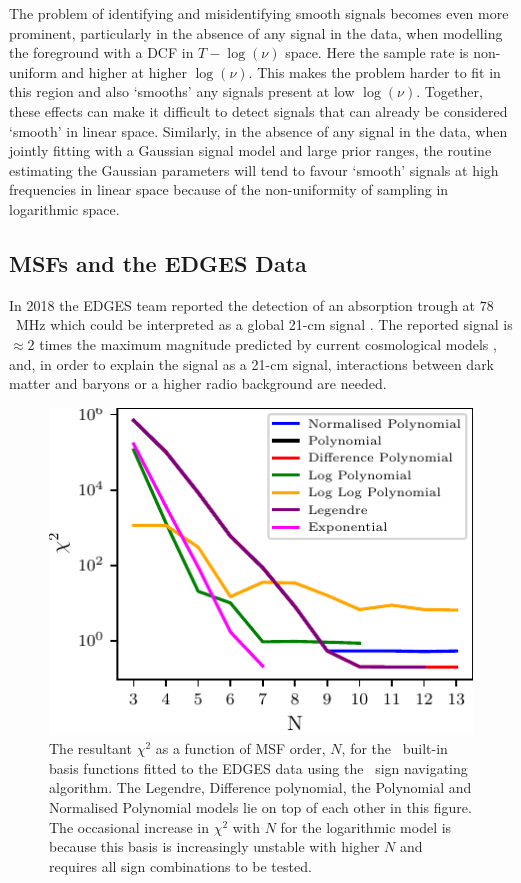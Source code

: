 The problem of identifying and misidentifying smooth signals becomes even more prominent, particularly in the absence of any signal in the data, when modelling the foreground with a DCF in $T - \log(\nu)$ space. Here the sample rate is non-uniform and higher at higher $\log(\nu)$. This makes the problem harder to fit in this region and also `smooths' any signals present at low $\log(\nu)$. Together, these effects can make it difficult to detect signals that can already be considered `smooth' in linear space. Similarly, in the absence of any signal in the data, when jointly fitting with a Gaussian signal model and large prior ranges, the routine estimating the Gaussian parameters will tend to favour `smooth' signals at high frequencies in linear space because of the non-uniformity of sampling in logarithmic space.

\subsection{MSFs and the EDGES Data}
\label{sec:EDGES_fits}

In 2018 the EDGES team reported the detection of an absorption trough at $78$~MHz which could be interpreted as a global 21-cm signal \citep[]{Bowman_edges_2018}. The reported signal is $\approx 2$ times the maximum magnitude predicted by current cosmological models \citep[]{Cohen_global_2017}, and, in order to explain the signal as a 21-cm signal, interactions between dark matter and baryons \citep{Barkana_DM_2018, Barkana_DM_2018, KovetzDM2018, MunozDM2018, SlatyerDM2018} or a higher radio background \citep{Bowman_edges_2018, EwallRB2018, FengRB2018, JanaRB2018, Fialkov2019, MirochaRB2019} are needed.

\begin{figure}
    \centering
    \includegraphics{maxsmooth/figs/Figure10.pdf}
    \caption{The resultant $\chi^2$ as a function of MSF order, $N$, for the \maxsmooth~built-in basis functions fitted to the EDGES data using the \maxsmooth~sign navigating algorithm. The Legendre, Difference polynomial, the Polynomial and Normalised Polynomial models lie on top of each other in this figure. The occasional increase in $\chi^2$ with $N$ for the logarithmic model is because this basis is increasingly unstable with higher $N$ and requires all sign combinations to be tested.}
    \label{fig:EDGES_basis}
\end{figure}

